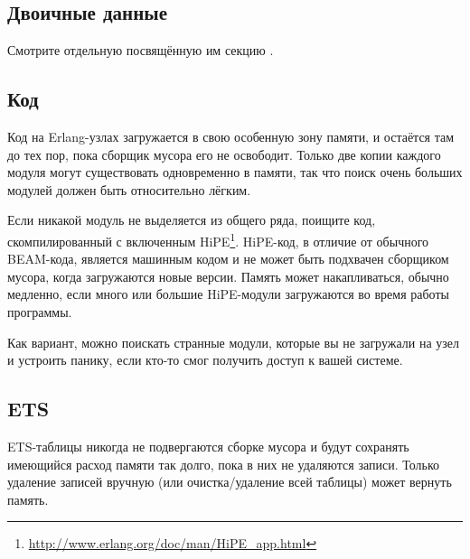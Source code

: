 \subsection{Двоичные данные}

Смотрите отдельную посвящённую им секцию .


\subsection{Код}

Код на Erlang-узлах загружается в свою особенную зону памяти, и остаётся там до тех пор, пока сборщик мусора его не освободит. Только две копии каждого модуля могут существовать одновременно в памяти, так что поиск очень больших модулей должен быть относительно лёгким.

Если никакой модуль не выделяется из общего ряда, поищите код, скомпилированный с включенным HiPE\footnote{\href{http://www.erlang.org/doc/man/HiPE\_app.html}{http://www.erlang.org/doc/man/HiPE\_app.html}}. HiPE-код, в отличие от обычного BEAM-кода, является машинным кодом и не может быть подхвачен сборщиком мусора, когда загружаются новые версии. Память может накапливаться, обычно медленно, если много или большие HiPE-модули загружаются во время работы программы.

Как вариант, можно поискать странные модули, которые вы не загружали на узел и устроить панику, если кто-то смог получить доступ к вашей системе.


\subsection{ETS}

ETS-таблицы никогда не подвергаются сборке мусора и будут сохранять имеющийся расход памяти так долго, пока в них не удаляются записи. Только удаление записей вручную (или очистка/удаление всей таблицы) может вернуть память.

